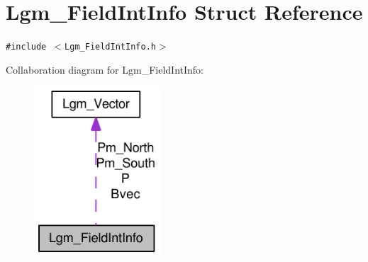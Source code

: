 \hypertarget{struct_lgm___field_int_info}{
\section{Lgm\_\-FieldIntInfo Struct Reference}
\label{struct_lgm___field_int_info}
}
{\tt \#include $<$Lgm\_\-FieldIntInfo.h$>$}

Collaboration diagram for Lgm\_\-FieldIntInfo:\nopagebreak
\begin{figure}[H]
\begin{center}
\leavevmode
\includegraphics[width=134pt]{struct_lgm___field_int_info__coll__graph}
\end{center}
\end{figure}
